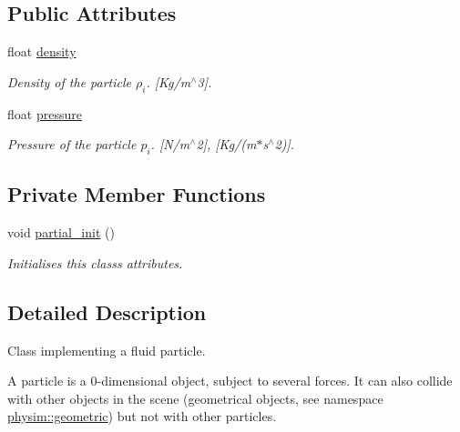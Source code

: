 \subsection*{Public Attributes}
\begin{DoxyCompactItemize}
\item 
\mbox{\label{classphysim_1_1particles_1_1fluid__particle_a0664c7d411aae32890f6fd359c74f2bc}} 
float \hyperlink{classphysim_1_1particles_1_1fluid__particle_a0664c7d411aae32890f6fd359c74f2bc}{density}
\begin{DoxyCompactList}\small\item\em Density of the particle $\rho_i$. \mbox{[}Kg/m$^\wedge$3\mbox{]}. \end{DoxyCompactList}\item 
\mbox{\label{classphysim_1_1particles_1_1fluid__particle_a2829dc6a83026e0854dd0ef4064f19b6}} 
float \hyperlink{classphysim_1_1particles_1_1fluid__particle_a2829dc6a83026e0854dd0ef4064f19b6}{pressure}
\begin{DoxyCompactList}\small\item\em Pressure of the particle $p_i$. \mbox{[}N/m$^\wedge$2\mbox{]}, \mbox{[}Kg/(m$\ast$s$^\wedge$2)\mbox{]}. \end{DoxyCompactList}\end{DoxyCompactItemize}
\subsection*{Private Member Functions}
\begin{DoxyCompactItemize}
\item 
void \hyperlink{classphysim_1_1particles_1_1fluid__particle_a5860aec6ef23bd4a700df26eb6b7b2f7}{partial\+\_\+init} ()
\begin{DoxyCompactList}\small\item\em Initialises this class\textquotesingle{}s attributes. \end{DoxyCompactList}\end{DoxyCompactItemize}


\subsection{Detailed Description}
Class implementing a fluid particle. 

A particle is a 0-\/dimensional object, subject to several forces. It can also collide with other objects in the scene (geometrical objects, see namespace \hyperlink{namespacephysim_1_1geometric}{physim\+::geometric}) but not with other particles. 

